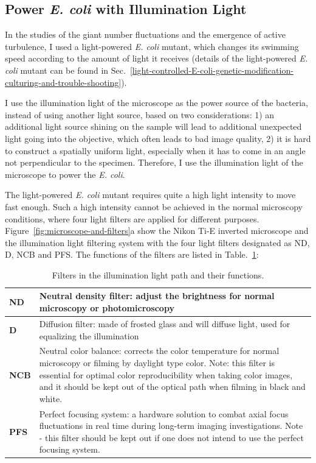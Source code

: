 \subsection{Power \textit{E. coli} with Illumination Light}
In the studies of the giant number fluctuations and the emergence of active turbulence, I used a light-powered \textit{E. coli} mutant, which changes its swimming speed according to the amount of light it receives (details of the light-powered \textit{E. coli} mutant can be found in Sec.~\ref{light-controlled-E-coli-genetic-modification-culturing-and-trouble-shooting}).

I use the illumination light of the microscope as the power source of the bacteria, instead of using another light source, based on two considerations: 1) an additional light source shining on the sample will lead to additional unexpected light going into the objective, which often leads to bad image quality, 2) it is hard to construct a spatially uniform light, especially when it has to come in an angle not perpendicular to the specimen. Therefore, I use the illumination light of the microscope to power the \textit{E. coli}.

The light-powered \textit{E. coli} mutant requires quite a high light intensity to move fast enough. Such a high intensity cannot be achieved in the normal microscopy conditions, where four light filters are applied for different purposes. Figure~\ref{fig:microscope-and-filters}a show the Nikon Ti-E inverted microscope and the illumination light filtering system with the four light filters designated as ND, D, NCB and PFS. The functions of the filters are listed in Table.~\ref{table:2-1}:

\begin{table}[hp]
	\centering
	\begin{tabular}{ | p{0.4in} | p{5in} |}
		\hline
		\textbf{ND} & Neutral density filter: adjust the brightness for normal microscopy or photomicroscopy \\
		\hline
		\textbf{D} & Diffusion filter: made of frosted glass and will diffuse light, used for equalizing the illumination \\
		\hline
		\textbf{NCB} & Neutral color balance: corrects the color temperature for normal microscopy or filming by daylight type color. Note: this filter is essential for optimal color reproducibility when taking color images, and it should be kept out of the optical path when filming in black and white. \\
		\hline
		\textbf{PFS} & Perfect focusing system: a hardware solution to combat axial focus fluctuations in real time during long-term imaging investigations. Note - this filter should be kept out if one does not intend to use the perfect focusing system.\\
		\hline
	\end{tabular}
	\caption[Filters in the Illumination Light Path and Their Functions.]{Filters in the illumination light path and their functions.}
	\label{table:2-1}
\end{table}

